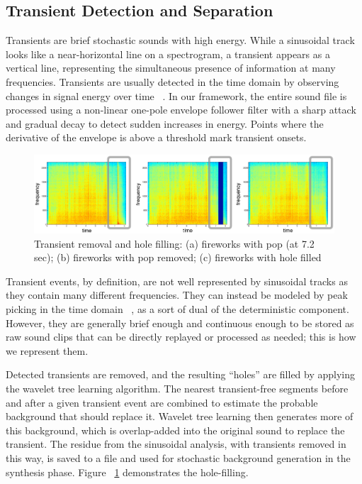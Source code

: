 \documentclass[review]{acmsiggraph}      %
\begin{document}
\subsection{Transient Detection and Separation}

Transients are brief stochastic sounds with high energy. While a sinusoidal track 
looks like a near-horizontal line on a spectrogram, a transient 
appears as a vertical line, representing the simultaneous presence of information 
at many frequencies. Transients are usually detected in the time domain by observing 
changes in signal energy over time ~\cite{Verma98,Bello05}. 
In our framework, the entire sound file is processed 
using a non-linear one-pole envelope follower filter with a sharp attack and gradual 
decay to detect sudden increases in energy. Points where the derivative of the envelope 
is above a threshold mark transient onsets. 
\begin{figure}[h]
\setlength\textfloatsep{0pt}
\setlength\abovecaptionskip{0pt}
\setlength\belowcaptionskip{0pt}
\centering
   \includegraphics[width=.48\textwidth]{transient3.eps}
\caption{Transient removal and hole filling: (a) fireworks with pop (at 7.2 sec); (b) 
fireworks with pop removed; (c) fireworks with hole filled}
\label{fig:transient}
\end{figure}

Transient events, by definition, are not well represented by sinusoidal tracks as they 
contain many different frequencies. They can instead be modeled by peak picking in the 
time domain ~\cite{Verma98}, as a sort of dual of the deterministic component. 
However, they are generally brief enough and continuous enough to be 
stored as raw sound clips that can be directly replayed or processed as needed; 
this is how we represent them. 

Detected transients are removed, and the resulting ``holes'' are filled by applying the 
wavelet tree learning algorithm. 
The nearest transient-free segments before and after a given transient event are 
combined to estimate the probable background that should replace it. Wavelet tree 
learning then generates more of this background, which is overlap-added into the original 
sound to replace the transient. The residue from the sinusoidal analysis, with transients 
removed in this way, is saved to a file and used for stochastic background generation in the 
synthesis phase. Figure ~\ref{fig:transient} demonstrates the hole-filling. 
\end{document}
